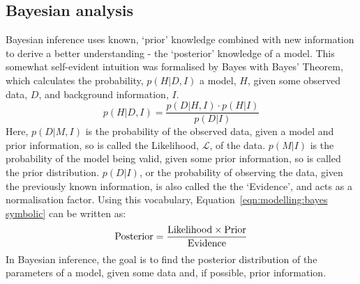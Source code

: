 \subsection{Bayesian analysis}
Bayesian inference uses known, `prior' knowledge combined with new information to derive a better understanding - the `posterior' knowledge of a model. This somewhat self-evident intuition was formalised by Bayes with Bayes' Theorem, which calculates the probability, $p(H | D, I)$ a model, $H$, given some observed data, $D$, and background information, $I$.
\begin{equation}
    \label{eqn:modelling:bayes symbolic}
    p(H | D,I) = \frac{p(D | H, I) \cdot p(H | I)}{p(D|I)}
\end{equation}
Here, $p(D | M, I)$ is the probability of the observed data, given a model and prior information, so is called the Likelihood, $\mathcal{L}$, of the data.
$p(M|I)$ is the probability of the model being valid, given some prior information, so is called the prior distribution. $p(D | I)$, or the probability of observing the data, given the previously known information, is also called the the `Evidence', and acts as a normalisation factor. Using this vocabulary, Equation~\ref{eqn:modelling:bayes symbolic} can be written as:
\begin{equation}
    \label{eqn:modelling:bayes english}
    \rm Posterior = \frac{Likelihood \times Prior}{Evidence}
\end{equation}
In Bayesian inference, the goal is to find the posterior distribution of the parameters of a model, given some data and, if possible, prior information.


